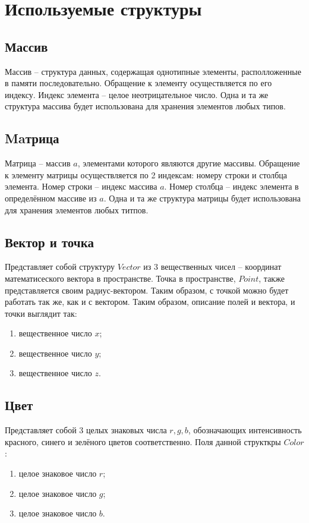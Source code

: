 \section{Используемые структуры} {
    \subsection{Массив} {
        Массив -- структура данных, содержащая однотипные элементы,
        располложенные в памяти последовательно.
        Обращение к элементу осуществляется по его индексу.
        Индекс элемента -- целое неотрицательное число.
        Одна и та же структура массива будет использована для хранения
        элементов любых типов.
    }
    \subsection{Maтрица} {
        Матрица -- массив $a$, элементами которого являются другие массивы.
        Обращение к элементу матрицы осуществляется по 2 индексам:
        номеру строки и столбца элемента.
        Номер строки -- индекс массива $a$.
        Номер столбца -- индекс элемента в определённом массиве из $a$.
        Одна и та же структура матрицы будет использована для хранения
        элементов любых титпов.
    }
    \subsection{Вектор и точка} {
        Представляет собой структуру $Vector$ из  3 вещественных чисел --
        координат математисеского вектора в пространстве.
        Точка в пространстве, $Point$, также представляется своим радиус-вектором.
        Таким образом, с точкой можно будет работать так же, как и с вектором.
        Таким образом, описание полей и вектора, и точки выглядит так:
        \begin{enumerate}
            \item вещественное число $x$;
            \item вещественное число $y$;
            \item вещественное число $z$.
        \end{enumerate}
    }
    \subsection{Цвет} {
        Представляет собой 3 целых знаковых числа $r, g, b$, обозначающих интенсивность
        красного, синего и зелёного цветов соответственно.
        Поля данной структкры $Color$:
        \begin{enumerate}
            \item целое знаковое число $r$;
            \item целое знаковое число $g$;
            \item целое знаковое число $b$.
        \end{enumerate}
    }
}

